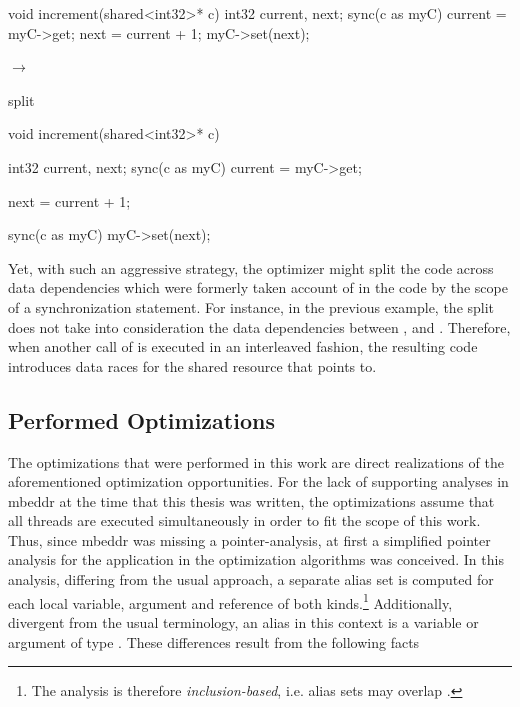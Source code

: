 \vspace{4mm}
\begin{minipage}{1\textwidth}
\begin{minipage}{0.37\textwidth}
\begin{ccode}{}
void increment(shared<int32>* c) {
  int32 current, next;
  sync(c as myC) {
    current = myC->get;
    next = current + 1;
    myC->set(next);
  }
}
\end{ccode}
\end{minipage}
\begin{minipage}{0.2\textwidth}
\begin{center}
$\longrightarrow$

split
\end{center}
\end{minipage}
\begin{minipage}{0.42\textwidth}
\begin{ccode}{}
void increment(shared<int32>* c) {
  int32 current, next;
  sync(c as myC) { current = myC->get; }
  
  next = current + 1;

  sync(c as myC) { myC->set(next); }
}
\end{ccode}
\end{minipage}
\end{minipage}
\vspace{2mm}

Yet, with such an aggressive strategy, the optimizer might split the code across data dependencies which were formerly taken account of in the code by the scope of a synchronization statement. For instance, in the previous example, the split does not take into consideration the data dependencies between ,  and . Therefore, when another call of  is executed in an interleaved fashion, the resulting code introduces data races for the shared resource that  points to.

\subsection{Performed Optimizations}
The optimizations that were performed in this work are direct realizations of the aforementioned optimization opportunities. For the lack of supporting analyses in mbeddr at the time that this thesis was written, the optimizations assume that all threads are executed simultaneously in order to fit the scope of this work. Thus, since mbeddr was missing a pointer-analysis, at first a simplified pointer analysis for the application in the optimization algorithms was conceived. In this analysis, differing from the usual approach, a separate alias set is computed for each local variable, argument and reference of both kinds.\footnote{The analysis is therefore \textit{inclusion-based}, i.e. alias sets may overlap \cite{CloningBasedContextSensitive}.} Additionally, divergent from the usual terminology, an alias in this context is a variable or argument of type . These differences result from the following facts


